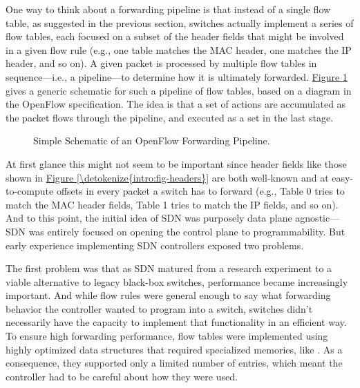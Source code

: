 \documentclass[letterpaper,11pt,english]{sphinxmanual}
\let\sphinxpxdimen\pdfpxdimen\else\newdimen\sphinxpxdimen
\begin{document}
One way to think about a forwarding pipeline is that instead of a
single flow table, as suggested in the previous section, switches
actually implement a series of flow tables, each focused on a subset
of the header fields that might be involved in a given flow rule
(e.g., one table matches the MAC header, one matches the IP header,
and so on). A given packet is processed by multiple flow tables in
sequence—i.e., a pipeline—to determine how it is ultimately
forwarded. \hyperref[\detokenize{intro:fig-pipeline}]{Figure \ref{\detokenize{intro:fig-pipeline}}} gives a generic
schematic for such a pipeline of flow tables, based on a diagram in
the OpenFlow specification. The idea is that a set of actions are
accumulated as the packet flows through the pipeline, and executed as
a set in the last stage.

\begin{figure}[htbp]
\centering
\capstart

\noindent\sphinxincludegraphics[width=500\sphinxpxdimen]{{Slide6}.png}
\caption{Simple Schematic of an OpenFlow Forwarding Pipeline.}\label{\detokenize{intro:id15}}\label{\detokenize{intro:fig-pipeline}}\end{figure}

At first glance this might not seem to be important since header
fields like those shown in \hyperref[\detokenize{intro:fig-headers}]{Figure \ref{\detokenize{intro:fig-headers}}} are both
well-known and at easy-to-compute offsets in every packet a switch has
to forward (e.g., Table 0 tries to match the MAC header fields, Table
1 tries to match the IP fields, and so on). And to this point, the
initial idea of SDN was purposely data plane agnostic—SDN was entirely
focused on opening the control plane to programmability. But early
experience implementing SDN controllers exposed two problems.

The first problem was that as SDN matured from a research experiment
to a viable alternative to legacy black-box switches, performance
became increasingly important. And while flow rules were general
enough to say what forwarding behavior the controller wanted to
program into a switch, switches didn’t necessarily have the capacity
to implement that functionality in an efficient way. To ensure high
forwarding performance, flow tables were implemented using highly
optimized data structures that required specialized memories, like
. As a consequence, they
supported only a limited number of entries, which meant the controller
had to be careful about how they were used.
\end{document}
